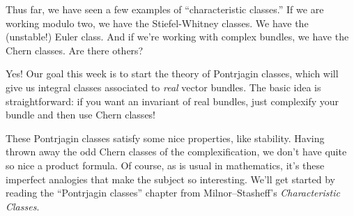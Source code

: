 \documentclass{homework}
\author{Jim Fowler}
\date{Week 12: Pontrjagin classes}
\begin{document}
\maketitle

Thus far, we have seen a few examples of ``characteristic classes.''
If we are working modulo two, we have the Stiefel-Whitney classes.  We
have the (unstable!) Euler class.  And if we're working with complex
bundles, we have the Chern classes.  Are there others?

Yes!  Our goal this week is to start the theory of Pontrjagin classes,
which will give us integral classes associated to \textit{real} vector
bundles.  The basic idea is straightforward: if you want an invariant
of real bundles, just complexify your bundle and then use Chern
classes!

These Pontrjagin classes satisfy some nice properties, like stability.
Having thrown away the odd Chern classes of the complexification, we
don't have quite so nice a product formula.  Of course, as is usual in
mathematics, it's these imperfect analogies that make the subject so
interesting.  We'll get started by reading the ``Pontrjagin classes''
chapter from Milnor--Stasheff's \textit{Characteristic Classes}.
\end{document}

